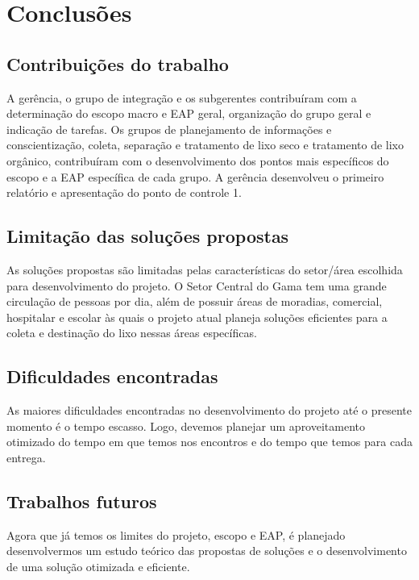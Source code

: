 \chapter[Conclusões]{Conclusões}

  \section{Contribuições do trabalho}

  A gerência, o grupo de integração e os subgerentes contribuíram com a determinação do escopo macro e EAP geral, organização do grupo geral e indicação de tarefas. Os grupos de planejamento de informações e conscientização, coleta, separação e tratamento de lixo seco e tratamento de lixo orgânico, contribuíram com o desenvolvimento dos pontos mais específicos do escopo e a EAP específica de cada grupo. A gerência desenvolveu o primeiro relatório e apresentação do ponto de controle 1.

  \section{Limitação das soluções propostas}

  As soluções propostas são limitadas pelas características do setor/área escolhida para desenvolvimento do projeto. O Setor Central do Gama tem uma grande circulação de pessoas por dia, além de possuir áreas de moradias, comercial, hospitalar e escolar às quais o projeto atual planeja soluções eficientes para a coleta e destinação do lixo nessas áreas específicas.

  \section{Dificuldades encontradas}

  As maiores dificuldades encontradas no desenvolvimento do projeto até o presente momento é o tempo escasso. Logo, devemos planejar um aproveitamento otimizado do tempo em que temos nos encontros e do tempo que temos para cada entrega.

  \section{Trabalhos futuros}

    Agora que já temos os limites do projeto, escopo e EAP, é planejado desenvolvermos um estudo teórico das propostas de soluções e o desenvolvimento de uma solução otimizada e eficiente.
